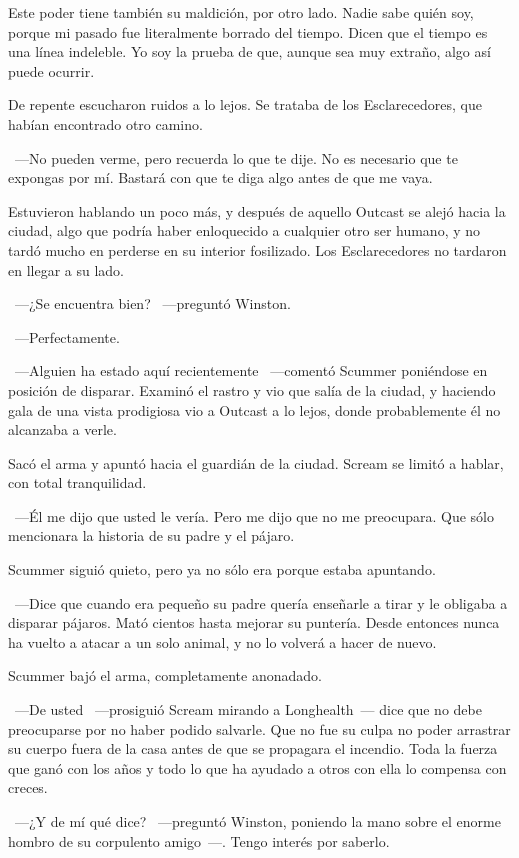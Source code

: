 \rquoti Este poder tiene también su maldición, por otro lado. Nadie sabe quién soy, porque mi pasado fue literalmente borrado del tiempo. Dicen que el tiempo es una línea indeleble. Yo soy la prueba de que, aunque sea muy extraño, algo así puede ocurrir.

De repente escucharon ruidos a lo lejos. Se trataba de los Esclarecedores, que habían encontrado otro camino.

~---No pueden verme, pero recuerda lo que te dije. No es necesario que te expongas por mí. Bastará con que te diga algo antes de que me vaya.

Estuvieron hablando un poco más, y después de aquello Outcast se alejó hacia la ciudad, algo que podría haber enloquecido a cualquier otro ser humano, y no tardó mucho en perderse en su interior fosilizado. Los Esclarecedores no tardaron en llegar a su lado.

~---¿Se encuentra bien? ~---preguntó Winston.

~---Perfectamente.

~---Alguien ha estado aquí recientemente ~---comentó Scummer poniéndose en posición de disparar. Examinó el rastro y vio que salía de la ciudad, y haciendo gala de una vista prodigiosa vio a Outcast a lo lejos, donde probablemente él no alcanzaba a verle.

Sacó el arma y apuntó hacia el guardián de la ciudad. Scream se limitó a hablar, con total tranquilidad.

~---Él me dijo que usted le vería. Pero me dijo que no me preocupara. Que sólo mencionara la historia de su padre y el pájaro.

Scummer siguió quieto, pero ya no sólo era porque estaba apuntando.

~---Dice que cuando era pequeño su padre quería enseñarle a tirar y le obligaba a disparar pájaros. Mató cientos hasta mejorar su puntería. Desde entonces nunca ha vuelto a atacar a un solo animal, y no lo volverá a hacer de nuevo.

Scummer bajó el arma, completamente anonadado.

~---De usted ~---prosiguió Scream mirando a Longhealth~--- dice que no debe preocuparse por no haber podido salvarle. Que no fue su culpa no poder arrastrar su cuerpo fuera de la casa antes de que se propagara el incendio. Toda la fuerza que ganó con los años y todo lo que ha ayudado a otros con ella lo compensa con creces.

~---¿Y de mí qué dice? ~---preguntó Winston, poniendo la mano sobre el enorme hombro de su corpulento amigo~---. Tengo interés por saberlo.

